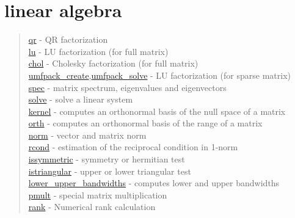 \chapter*{linear algebra}

\begin{quote}
\noindent
\hyperlink{qr}{qr} - QR factorization\\
\hyperlink{lu}{lu} - LU factorization (for full matrix) \\
\hyperlink{chol}{chol} - Cholesky factorization (for full matrix) \\
\hyperlink{umfpack_create}{umfpack\_create},\hyperlink{umfpack_solve}{umfpack\_solve}
- LU factorization (for sparse matrix) \\
\hyperlink{spec}{spec} - matrix spectrum, eigenvalues and eigenvectors\\
\hyperlink{solve}{solve} - solve a linear system\\
\hyperlink{kernel}{kernel} - computes an orthonormal basis of the null space of a matrix\\
\hyperlink{orth}{orth} - computes an orthonormal basis of the range of a matrix\\
\hyperlink{norm}{norm} - vector and matrix norm\\
\hyperlink{rcond}{rcond} - estimation of the reciprocal condition in 1-norm\\
\hyperlink{issymmetric}{issymmetric} - symmetry or hermitian test\\
\hyperlink{istriangular}{istriangular} - upper or lower triangular test\\
\hyperlink{lower_upper_bandwidths}{lower\_upper\_bandwidths} - computes lower and upper bandwidths\\
\hyperlink{pmult}{pmult} - special matrix multiplication\\
\hyperlink{rank}{rank} - Numerical rank calculation \\
\end{quote}

 
 
 
 
 


 
 
 
 


